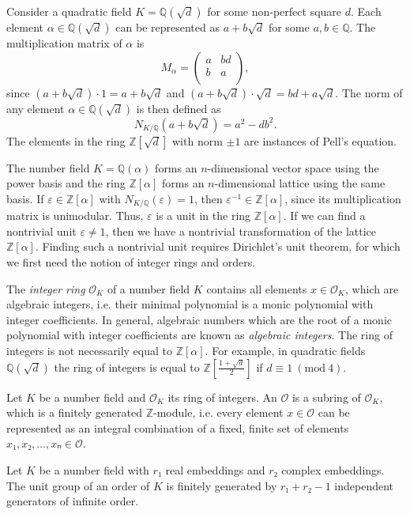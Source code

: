 \begin{example}
  Consider a quadratic field $K = ℚ(\sqrt{d})$ for some non-perfect square $d$.
  Each element $α ∈ ℚ(\sqrt{d})$ can be represented as $a + b \sqrt{d}$ for some $a, b ∈ ℚ$.
  The multiplication matrix of $α$ is
  \[
    M_α =
    \begin{pmatrix}
      a & bd \\
      b & a \\
    \end{pmatrix},
  \]
  since
  $(a + b \sqrt{d}) · 1 = a + b \sqrt{d}$ and
  $(a + b \sqrt{d}) · \sqrt{d} = bd + a \sqrt{d}$.
  The norm of any element $α ∈ ℚ(\sqrt{d})$ is then defined as
  \[
    N_{K/ℚ}(a + b \sqrt{d}) = a^2 - d b^2.
  \]
  The elements in the ring $ℤ[\sqrt{d}]$ with norm $±1$
  are instances of Pell's equation.
\end{example}

The number field $K = ℚ(α)$ forms an $n$-dimensional vector space using the power basis
and the ring $ℤ[α]$ forms an $n$-dimensional lattice using the same basis.
If $ε ∈ ℤ[α]$ with $N_{K/ℚ}(ε) = 1$, then $ε^{-1} ∈ ℤ[α]$,
since its multiplication matrix is unimodular.
Thus, $ε$ is a unit in the ring $ℤ[α]$.
If we can find a nontrivial unit $ε ≠ 1$,
then we have a nontrivial transformation of the lattice $ℤ[α]$.
Finding such a nontrivial unit requires Dirichlet's unit theorem,
for which we first need the notion of integer rings and orders.

The \emph{integer ring} $\mathcal O_K$ of a number field $K$
contains all elements $x ∈ \mathcal O_K$, which are algebraic integers,
i.e. their minimal polynomial is a monic polynomial with integer coefficients.
In general, algebraic numbers which are the root of a monic polynomial with integer coefficients
are known as \emph{algebraic integers}.
The ring of integers is not necessarily equal to $ℤ[α]$.
For example, in quadratic fields $ℚ(\sqrt{d})$
the ring of integers is equal to $ℤ\left[\frac{1+\sqrt{d}}{2}\right]$ if $d ≡ 1\ (\mathrm{mod}\ 4)$.

\begin{definition}
  Let $K$ be a number field and $\mathcal O_K$ its ring of integers.
  An  $\mathcal O$ is a subring of $\mathcal O_K$,
  which is a finitely generated $ℤ$-module,
  i.e. every element $x ∈ \mathcal O$ can be represented as an integral
  combination of a fixed, finite set of elements $x₁, x₂, …, xₙ ∈ \mathcal O$.
\end{definition}

\begin{theorem}
  \label{thm:dirichlet-unit}
  Let $K$ be a number field with $r₁$ real embeddings and $r₂$ complex embeddings.
  The unit group of an order of $K$ is finitely generated by $r₁ + r₂ - 1$
  independent generators of infinite order.
\end{theorem}

